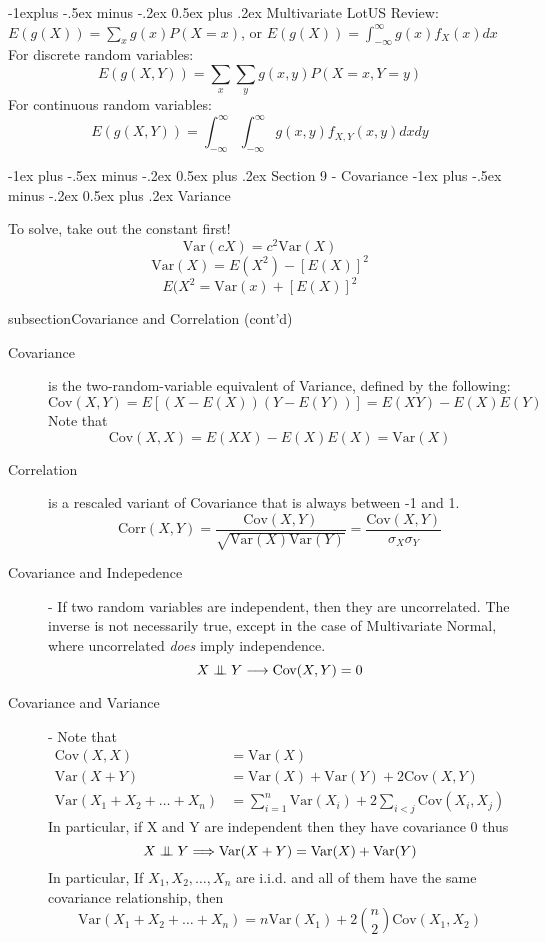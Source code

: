 \documentclass[10pt,landscape]{article}
\makeatletter
\theoremstyle{definition}
\newcommand\independent{\protect\mathpalette{\protect\independenT}{\perp}}
\def\independenT#1#2{\mathrel{\setbox0\hbox{$#1#2$}%
    \copy0\kern-\wd0\mkern4mu\box0}}
\newcommand{\var}{\textrm{Var}}
\newcommand{\cov}{\textrm{Cov}}
\newcommand{\corr}{\textrm{Corr}}
\renewcommand{\section}{\@startsection{section}{1}{0mm}%
                                {-1ex plus -.5ex minus -.2ex}%
                                {0.5ex plus .2ex}%
                                {\normalfont\large\bfseries}}
\renewcommand{\subsection}{\@startsection{subsection}{2}{0mm}%
                                {-1explus -.5ex minus -.2ex}%
                                {0.5ex plus .2ex}%
                                {\normalfont\normalsize\bfseries}}
\makeatother
\begin{document}
\begin{multicols}{3}
\subsection{Multivariate LotUS}
Review: $E(g(X)) = \sum_xg(x)P(X=x)$, or $E(g(X)) = \int_{-\infty}^{\infty}g(x)f_X(x)dx$\\ 
For discrete random variables:
\[E(g(X, Y)) = \sum_x\sum_yg(x, y)P(X=x, Y=y)\]
For continuous random variables:
\[E(g(X, Y)) = \int_{-\infty}^{\infty}\int_{-\infty}^{\infty}g(x, y)f_{X,Y}(x, y)dxdy\]

\section{Section 9 - Covariance}
\section{Variance}

To solve, take out the constant first!
\[\var(cX) = c^2\var(X)\]
\[\var(X) = E(X^2) - [E(X)]^2\]
\[E(X^2=\var(x)+[E(X)]^2\]

subsection{Covariance and Correlation (cont'd)}
\begin{description}
\item [Covariance] is the two-random-variable equivalent of Variance, defined by the following:
    \[\cov(X, Y) = E[(X - E(X))(Y - E(Y))] = E(XY) - E(X)E(Y)\]
    Note that 
    \[\cov(X, X) = E(XX) - E(X)E(X) =  \var(X)\]
\item [Correlation] is a rescaled variant of Covariance that is always between -1 and 1.
    \[\corr(X, Y) = \frac{\cov(X, Y)}{\sqrt{\var(X)\var(Y)}} = \frac{\cov(X, Y)}{\sigma_X\sigma_Y}\]
\item [Covariance and Indepedence] - If two random variables are independent, then they are uncorrelated. The inverse is not necessarily true, except in the case of Multivariate Normal, where uncorrelated \emph{does} imply independence.
    \[X \independent Y \longrightarrow \cov(X, Y) = 0\]

\item [Covariance and Variance] - Note that
    \begin{align*}
        \cov(X, X) &= \var(X) \\
        \var(X + Y) &= \var(X) + \var(Y) + 2\cov(X, Y) \\
        \var(X_1 + X_2 + \dots + X_n ) &= \sum_{i = 1}^{n}\var(X_i) + 2\sum_{i < j} \cov(X_i, X_j)
    \end{align*}
    In particular, if X and Y are independent then they have covariance 0 thus
    \[X \independent Y \Longrightarrow \var(X + Y) = \var(X) + \var(Y)\]
    In particular, If $X_1, X_2, \dots, X_n$ are i.i.d. and all of them have the same covariance relationship, then 
    \[\var(X_1 + X_2 + \dots + X_n ) = n\var(X_1) + 2{n \choose 2}\cov(X_1, X_2)\]
    

\end{description}
\end{multicols}
\end{document}
